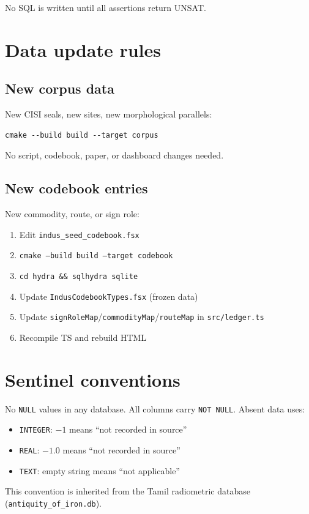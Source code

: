 \documentclass[11pt]{article}
\begin{document}
No SQL is written until all assertions return UNSAT.

\section{Data update rules}

\subsection{New corpus data}

New CISI seals, new sites, new morphological parallels:
\begin{Verbatim}[fontsize=\small,frame=single]
cmake --build build --target corpus
\end{Verbatim}
No script, codebook, paper, or dashboard changes needed.

\subsection{New codebook entries}

New commodity, route, or sign role:
\begin{enumerate}[nosep]
\item Edit \texttt{indus\_seed\_codebook.fsx}
\item \texttt{cmake --build build --target codebook}
\item \texttt{cd hydra \&\& sqlhydra sqlite}
\item Update \texttt{IndusCodebookTypes.fsx} (frozen data)
\item Update \texttt{signRoleMap}/\texttt{commodityMap}/\texttt{routeMap}
  in \texttt{src/ledger.ts}
\item Recompile TS and rebuild HTML
\end{enumerate}

\section{Sentinel conventions}

No \texttt{NULL} values in any database. All columns carry
\texttt{NOT NULL}. Absent data uses:
\begin{itemize}[nosep]
\item \texttt{INTEGER}: $-1$ means ``not recorded in source''
\item \texttt{REAL}: $-1.0$ means ``not recorded in source''
\item \texttt{TEXT}: empty string means ``not applicable''
\end{itemize}

This convention is inherited from the Tamil radiometric database
(\texttt{antiquity\_of\_iron.db}).
\end{document}
